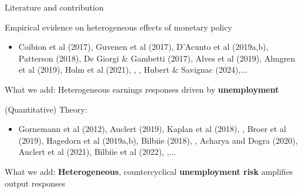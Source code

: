 \documentclass[10pt, aspectratio = 169]{beamer} %
\theoremstyle{mystyle}
\begin{document}
\begin{frame}{Literature and contribution}


\alert{Empirical evidence on heterogeneous effects of monetary policy}
\begin{itemize}
    \item \footnotesize{Coibion et al (2017), Guvenen et al (2017), D’Acunto et al (2019a,b), Patterson (2018), De Giorgi \& Gambetti (2017), Alves et al (2019), Almgren et al (2019), Holm et al (2021), , , Hubert \& Savignac (2024),...}
\end{itemize}
\alert{What we add:} Heterogeneous earnings responses driven by \textbf{unemployment}
\vspace{0.5cm}

\alert{(Quantitative) Theory:}
\begin{itemize}
    \item \footnotesize{Gornemann et al (2012), Auclert (2019), Kaplan et al (2018), , Broer et al (2019), Hagedorn et al (2019a,b), {Bilbiie (2018)}, , {Acharya and Dogra (2020)}, Auclert et al (2021), Bilbiie et al (2022), ,...}
\end{itemize}
\alert{What we add:} \textbf{Heterogeneous}, countercyclical \textbf{unemployment risk} amplifies output responses
\end{frame}


\end{document}
